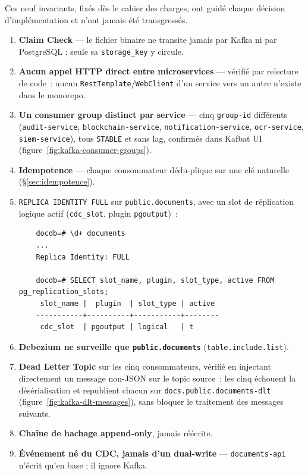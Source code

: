 \documentclass[12pt,a4paper,openany]{report}
\begin{document}
    Ces neuf invariants, fix\'es d\`es le cahier des charges, ont guid\'e chaque d\'ecision d'impl\'ementation et n'ont jamais \'et\'e transgress\'es.

    \begin{enumerate}[leftmargin=1.5em]
      \item \textbf{Claim Check} --- le fichier binaire ne transite jamais par Kafka ni par PostgreSQL ; seule sa \texttt{storage\_key} y circule.
      \item \textbf{Aucun appel HTTP direct entre microservices} --- v\'erifi\'e par relecture de code~: aucun \texttt{RestTemplate}/\texttt{WebClient} d'un service vers un autre n'existe dans le monorepo.
      \item \textbf{Un consumer group distinct par service} --- cinq \texttt{group-id} diff\'erents (\texttt{audit-service}, \texttt{blockchain-service}, \texttt{notification-service}, \texttt{ocr-service}, \texttt{siem-service}), tous \texttt{STABLE} et sans lag, confirm\'es dans Kafbat UI (figure~\ref{fig:kafka-consumer-groups}).
      \item \textbf{Idempotence} --- chaque consommateur d\'edu-plique sur une cl\'e naturelle (\S\ref{sec:idempotence}).
      \item \texttt{REPLICA IDENTITY FULL} sur \texttt{public.documents}, avec un slot de r\'eplication logique actif (\texttt{cdc\_slot}, plugin \texttt{pgoutput})~:
    \begin{lstlisting}
    docdb=# \d+ documents
    ...
    Replica Identity: FULL

    docdb=# SELECT slot_name, plugin, slot_type, active FROM pg_replication_slots;
     slot_name |  plugin  | slot_type | active
    -----------+----------+-----------+--------
     cdc_slot  | pgoutput | logical   | t
    \end{lstlisting}
      \item \textbf{Debezium ne surveille que \texttt{public.documents}} (\texttt{table.include.list}).
      \item \textbf{Dead Letter Topic} sur les cinq consommateurs, v\'erifi\'e en injectant directement un message non-JSON sur le topic source~: les cinq \'echouent la d\'es\'erialisation et republient chacun sur \texttt{docs.public.documents-dlt} (figure~\ref{fig:kafka-dlt-messages}), sans bloquer le traitement des messages suivants.
      \item \textbf{Cha\^ine de hachage append-only}, jamais r\'e\'ecrite.
      \item \textbf{\'Ev\'enement n\'e du CDC, jamais d'un dual-write} --- \texttt{documents-api} n'\'ecrit qu'en base ; il ignore Kafka.
    \end{enumerate}
\end{document}
